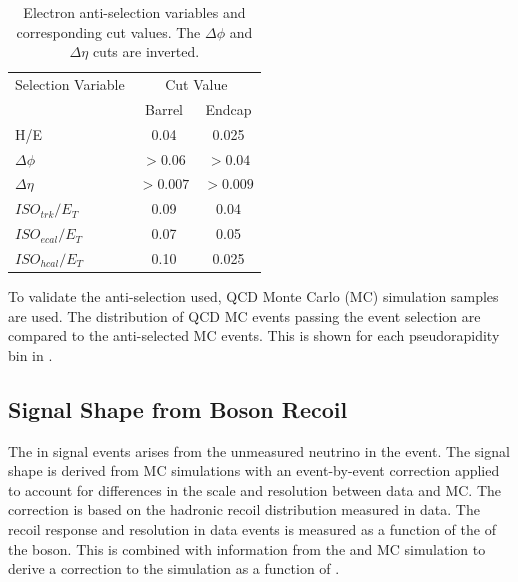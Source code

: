 \begin{table}[htbp]
  \begin{center}
    \leavevmode
    \begin{tabular}{lcc} 
    \toprule
      Selection Variable & \multicolumn{2}{c}{Cut Value}\\
                         & Barrel & Endcap\\
    \midrule
        H/E & 0.04 & 0.025 \\
        $\Delta\phi$ & $>0.06$  & $>0.04$ \\
        $\Delta\eta$ & $>0.007$ & $>0.009$\\
        $ISO_{trk} / E_T $ & 0.09 & 0.04 \\
        $ISO_{ecal}/ E_T$  & 0.07 & 0.05 \\
        $ISO_{hcal}/ E_T$  & 0.10 & 0.025\\ 
    \bottomrule
    \end{tabular}
    \caption[Electron anti-selection variables and corresponding cut values.]
{\label{tab:antisel} Electron anti-selection variables and corresponding cut
values. The $\Delta\phi$ and $\Delta\eta$ cuts are
inverted\cite{baisini2010electron}.}
  \end{center}
\end{table}

To validate the anti-selection used, {QCD} Monte Carlo (MC) simulation samples are used. The
distribution of {QCD} MC events passing the event selection are compared to the
anti-selected MC events. This is shown for each pseudorapidity bin in
.

\subsection{Signal \ETm Shape from Boson Recoil}
\label{sec:recoil}
The \ETm in signal events arises from the unmeasured neutrino in the event. 
The signal \ETm shape is derived from MC simulations with an event-by-event
correction applied to account for differences in the \ETm scale and resolution
between data and MC.
The correction is based on the hadronic recoil distribution measured in data.
The recoil response and resolution in \HepProcess{\PZ\to\Plepton\Plepton} data
events is measured as a function of the \pT of the boson. This is combined with
information from the \PW and \PZ MC simulation to derive a correction to
the simulation \ETm as a function of \PW \pT
\cite{bauer2010modeling,alcaraz2010updated}.

